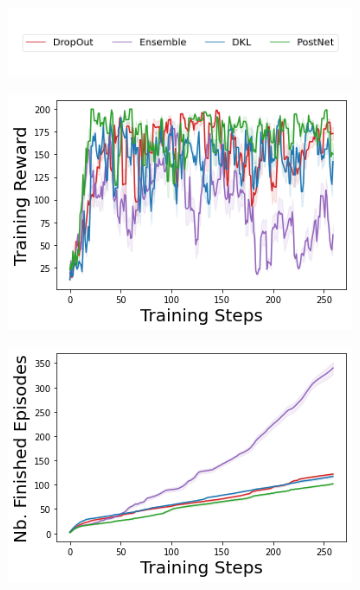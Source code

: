 \begin{figure}
    \centering
        \begin{subfigure}{.5\textwidth}
        \includegraphics[width=\textwidth]{sections/011_icml2022/resources/legend.png}
    \end{subfigure}
    \vspace{-5mm}
    
    \begin{subfigure}{.245\textwidth}
        \includegraphics[width=\textwidth]{sections/011_icml2022/resources/cartpole-training_total_reward-training-model.png}
    \end{subfigure}
    \begin{subfigure}{.245\textwidth}
        \includegraphics[width=\textwidth]{sections/011_icml2022/resources/cartpole-n_finished_training_episodes-training-model.png}  

\end{subfigure}
\end{figure}
